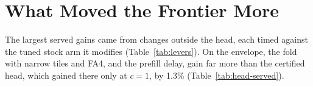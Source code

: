 \section{What Moved the Frontier More}\label{sec:levers}
The largest served gains came from changes outside the head, each timed against the tuned stock arm it modifies (Table~\ref{tab:levers}). On the envelope, the fold with narrow tiles and FA4, and the prefill delay, gain far more than the certified head, which gained there only at $c=1$, by 1.3\% (Table~\ref{tab:head-served}).

